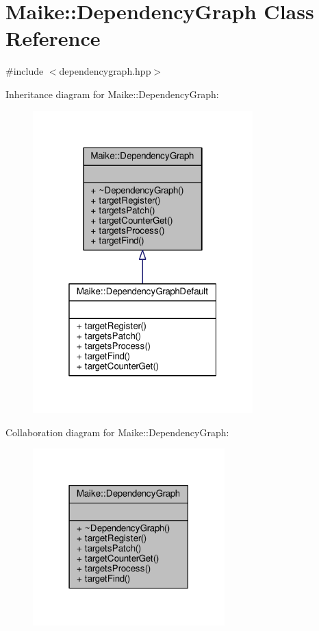 \hypertarget{class_maike_1_1_dependency_graph}{}\section{Maike\+:\+:Dependency\+Graph Class Reference}
\label{class_maike_1_1_dependency_graph}


{\ttfamily \#include $<$dependencygraph.\+hpp$>$}



Inheritance diagram for Maike\+:\+:Dependency\+Graph\+:\nopagebreak
\begin{figure}[H]
\begin{center}
\leavevmode
\includegraphics[width=241pt]{class_maike_1_1_dependency_graph__inherit__graph}
\end{center}
\end{figure}


Collaboration diagram for Maike\+:\+:Dependency\+Graph\+:\nopagebreak
\begin{figure}[H]
\begin{center}
\leavevmode
\includegraphics[width=210pt]{class_maike_1_1_dependency_graph__coll__graph}
\end{center}
\end{figure}

